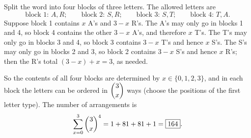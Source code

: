 Split the word into four blocks of three letters. The allowed letters are
\[
\text{block 1: } A,R;\qquad\text{block 2: } S,R;\qquad\text{block 3: } S,T;\qquad\text{block 4: } T,A .
\]
Suppose block 1 contains $x$ A's and $3-x$ R's. The A's may only go in blocks 1 and 4, so block 4 contains the other $3-x$ A's, and therefore $x$ T's. The T's may only go in blocks 3 and 4, so block 3 contains $3-x$ T's and hence $x$ S's. The S's may only go in blocks 2 and 3, so block 2 contains $3-x$ S's and hence $x$ R's; then the R's total $(3-x)+x=3$, as needed.

So the contents of all four blocks are determined by $x\in\{0,1,2,3\}$, and in each block the letters can be ordered in $\dbinom{3}{x}$ ways (choose the positions of the first letter type). The number of arrangements is
\[
\sum_{x=0}^{3}\dbinom{3}{x}^4=1+81+81+1=\boxed{164}.
\]
